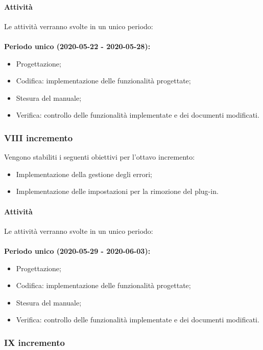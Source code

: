 \documentclass[../piano-di-progetto.tex]{subfiles}
\begin{document}
\paragraph{Attività}
Le attività verranno svolte in un unico periodo:
\\
\\
\textbf{Periodo unico (2020-05-22 - 2020-05-28):}
\begin{itemize}
    \item Progettazione;
    \item Codifica: implementazione delle funzionalità progettate;
    \item Stesura del manuale;
    \item Verifica: controllo delle funzionalità implementate e dei documenti modificati.
\end{itemize}


\subsubsection{VIII incremento}

 Vengono stabiliti i seguenti obiettivi per l'ottavo incremento:
 \begin{itemize}
    \item Implementazione della gestione degli errori;
    \item Implementazione delle impostazioni per la rimozione del plug-in.

 \end{itemize}
\paragraph{Attività}
Le attività verranno svolte in un unico periodo:
\\
\\
\textbf{Periodo unico (2020-05-29 - 2020-06-03):}
\begin{itemize}
    \item Progettazione;
    \item Codifica: implementazione delle funzionalità progettate;
    \item Stesura del manuale;
    \item Verifica: controllo delle funzionalità implementate e dei documenti modificati.
\end{itemize}


\subsubsection{IX incremento}
\end{document}
